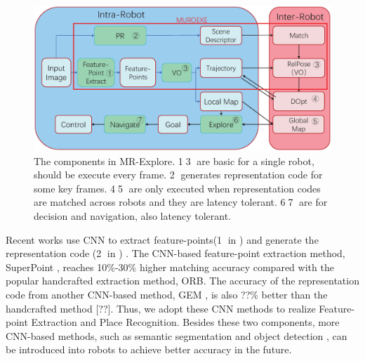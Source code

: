 \begin{figure}[t]
	\centering
	\includegraphics[width=0.99\linewidth]{fig/maexp.eps}
    \caption{
        The components in MR-Explore. \textcircled{1}\textcircled{3} are basic for a single robot, should be execute every frame. \textcircled{2} generates representation code for some key frames. \textcircled{4}\textcircled{5} are only executed when representation codes are matched across robots and they are latency tolerant.  \textcircled{6}\textcircled{7} are for decision and navigation, also latency tolerant.
    }
	\label{fig:maexp}
\end{figure}





Recent works use CNN to extract feature-points(\textcircled{1} in ) \cite{detone2018superpoint, simo2015discriminative, yi2016lift} and generate the representation code (\textcircled{2} in ) \cite{arandjelovic2016netvlad, radenovic2018fine}. 
The CNN-based feature-point extraction method, SuperPoint \cite{detone2018superpoint}, reaches 10\%-30\% higher matching accuracy compared with the popular handcrafted extraction method, ORB\cite{Mur-Artal:2017281}.
The accuracy of the representation code from another CNN-based method, GEM \cite{radenovic2018fine}, is also ??\% better than the handcrafted method [??].
Thus, we adopt these CNN methods to realize Feature-point Extraction and  Place Recognition. 
Besides these two components, more CNN-based methods, such as semantic segmentation \cite{long2015fully} and object detection \cite{ren2015faster}, can be introduced into robots to achieve better accuracy in the future.

